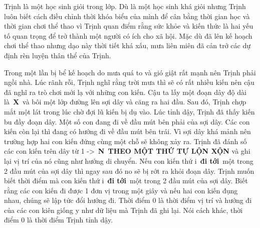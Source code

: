 Trịnh là một học sinh giỏi trong lớp. Dù là một học sinh khá giỏi nhưng Trịnh luôn biết cách điều chỉnh thời khóa biểu của mình để cân bằng thời gian học và thời gian chơi thể thao vì Trịnh quan điểm rằng sức khỏe và kiến thức là hai yếu tố quan trọng để trở thành một người có ích cho xã hội. Mặc dù đã lên kế hoạch chơi thể thao nhưng dạo này thời tiết khá xấu, mưa liên miên đã cản trở các dự định rèn luyện thân thể của Trịnh.

Trong một lần bị bể kế hoạch do mưa quá to và gió giật rất mạnh nên Trịnh phải ngồi nhà. Lúc rãnh rỗi, Trịnh nghĩ rằng trời mưa thì sẽ có rất nhiều kiến nên cậu đã nghĩ ra trò chơi mới lạ với những con kiến. Cậu ta lấy một đoạn dây độ dài là \textbf{X} và bôi một lớp đường lên sợi dây và căng ra hai đầu. Sau đó, Trịnh chợp mắt một lát trong lúc chờ đợi lũ kiến bị dụ vào. Lúc tỉnh dậy, Trịnh đã thấy kiến bu đầy đoạn dây. Một số con đang đi về đầu mút bên phải của sợi dây. Các con kiến còn lại thì đang có hướng đi về đầu mút bên trái. Vì sợi dây khá mảnh nên trường hợp hai con kiến đứng cùng một chỗ sẽ không xảy ra. Trịnh đã đánh số các con kiến trên dây từ 1 -> \textbf{N} \textbf{THEO MỘT THỨ TỰ LỘN XỘN} và ghi lại vị trí của nó cũng như hướng di chuyển. Nếu con kiến thứ i \textbf{đi tới} một trong 2 đầu mút của sợi dây thì ngay sau đó no sẽ bị rớt ra khỏi đoạn dây. Trịnh muốn biết thời điểm mà con kiến thứ i \textbf{đi tới} một trong 2 đầu mút của sợi dây. Biết rằng các con kiến đi được 1 đơn vị trong một giây và nếu hai con kiến đụng nhau, chúng sẽ lập tức đổi hướng đi. Thời điểm 0 là thời điểm vị trí và hướng đi của các con kiên giống y như dữ liệu mà Trịnh đã ghi lại. Nói cách khác, thời điểm 0 là thời điểm Trịnh tỉnh dậy.